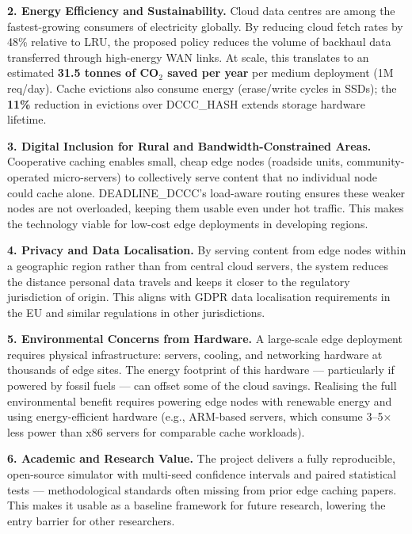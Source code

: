 \documentclass[12pt,a4paper]{report}
\begin{document}
\textbf{2. Energy Efficiency and Sustainability.}
Cloud data centres are among the fastest-growing consumers of electricity globally. By
reducing cloud fetch rates by 48\% relative to LRU, the proposed policy reduces the volume
of backhaul data transferred through high-energy WAN links. At scale, this translates to an
estimated \textbf{31.5 tonnes of CO$_2$ saved per year} per medium deployment (1M\,req/day).
Cache evictions also consume energy (erase/write cycles in SSDs); the \textbf{11\%} reduction
in evictions over DCCC\_HASH extends storage hardware lifetime.

\textbf{3. Digital Inclusion for Rural and Bandwidth-Constrained Areas.}
Cooperative caching enables small, cheap edge nodes (roadside units, community-operated
micro-servers) to collectively serve content that no individual node could cache alone.
DEADLINE\_DCCC's load-aware routing ensures these weaker nodes are not overloaded,
keeping them usable even under hot traffic. This makes the technology viable for low-cost
edge deployments in developing regions.

\textbf{4. Privacy and Data Localisation.}
By serving content from edge nodes within a geographic region rather than from central
cloud servers, the system reduces the distance personal data travels and keeps it closer to
the regulatory jurisdiction of origin. This aligns with GDPR data localisation requirements
in the EU and similar regulations in other jurisdictions.

\textbf{5. Environmental Concerns from Hardware.}
A large-scale edge deployment requires physical infrastructure: servers, cooling, and
networking hardware at thousands of edge sites. The energy footprint of this hardware ---
particularly if powered by fossil fuels --- can offset some of the cloud savings. Realising
the full environmental benefit requires powering edge nodes with renewable energy and
using energy-efficient hardware (e.g., ARM-based servers, which consume 3--5$\times$ less
power than x86 servers for comparable cache workloads).

\textbf{6. Academic and Research Value.}
The project delivers a fully reproducible, open-source simulator with multi-seed confidence
intervals and paired statistical tests --- methodological standards often missing from prior
edge caching papers. This makes it usable as a baseline framework for future research,
lowering the entry barrier for other researchers.

\clearpage


\end{document}

